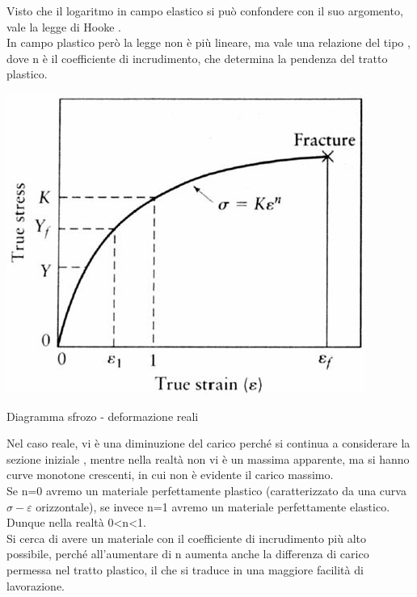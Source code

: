 Visto che il logaritmo in campo elastico si può confondere con il suo argomento, vale la legge di Hooke .\\
In campo plastico però la legge non è più lineare, ma vale una relazione del tipo , dove n è il coefficiente di incrudimento, che determina la pendenza del tratto plastico.\\
\begin{marginfigure}[-4cm]
\includegraphics{images/img30.png}
\caption{Diagramma sfrozo - deformazione reali}
\end{marginfigure}
Nel caso reale, vi è una diminuzione del carico perché si continua a considerare la sezione iniziale , mentre nella realtà non vi è un massima apparente, ma si hanno curve monotone crescenti, in cui non è evidente il carico massimo.\\
Se n=0 avremo un materiale perfettamente plastico (caratterizzato da una curva $\sigma-\varepsilon$ orizzontale), se invece n=1 avremo un materiale perfettamente elastico. Dunque nella realtà 0<n<1.\\
Si cerca di avere un materiale con il coefficiente di incrudimento più alto possibile, perché all’aumentare di n aumenta anche la differenza di carico permessa nel tratto plastico, il che si traduce in una maggiore facilità di lavorazione.

